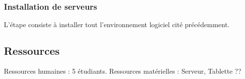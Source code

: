 \documentclass[a4paper,12pt]{article}
\begin{document}
\subsubsection{Installation de serveurs\\}
L'étape consiste à installer tout l'environnement logiciel cité précédemment. 

\subsection{Ressources}
 	
Ressources humaines : 5 étudiants. Ressources matérielles : Serveur, Tablette ??
\end{document}
